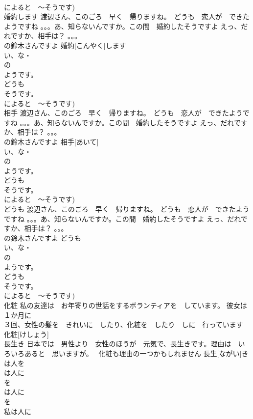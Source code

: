 \documentclass[8pt]{extreport}
\begin{document}
\begin{CJK}{UTF8}{min}
\\	によると　～そうです)	
\\	婚約します	渡辺さん、このごろ　早く　帰りますね。　どうも　恋人が　できたようですね 。。。あ、知らないんですか。この間　婚約したそうですよ えっ、だれですか、相手は？ 。。。
\\	の鈴木さんですよ	婚約[こんやく]します			
\\	い、な・
\\	の
\\	ようです。
\\	どうも
\\	そうです。
\\	によると　～そうです)	
\\	相手	渡辺さん、このごろ　早く　帰りますね。　どうも　恋人が　できたようですね 。。。あ、知らないんですか。この間　婚約したそうですよ えっ、だれですか、相手は？ 。。。
\\	の鈴木さんですよ	相手[あいて]			
\\	い、な・
\\	の
\\	ようです。
\\	どうも
\\	そうです。
\\	によると　～そうです)	
\\	どうも	渡辺さん、このごろ　早く　帰りますね。　どうも　恋人が　できたようですね 。。。あ、知らないんですか。この間　婚約したそうですよ えっ、だれですか、相手は？ 。。。
\\	の鈴木さんですよ	どうも			
\\	い、な・
\\	の
\\	ようです。
\\	どうも
\\	そうです。
\\	によると　～そうです)		
\\	化粧	私の友達は　お年寄りの世話をするボランティアを　しています。 彼女は　１か月に　
\\	３回、女性の髪を　きれいに　したり、化粧を　したり　しに　行っています	化粧[けしょう]			
\\	長生き	日本では　男性より　女性のほうが　元気で、長生きです。理由は　いろいろあると　思いますが。　 化粧も理由の一つかもしれません	長生[ながい]き			
\\	は人を
\\	は人に
\\	を
\\	は人に
\\	を
\\	私は人に

\end{CJK}
\end{document}
